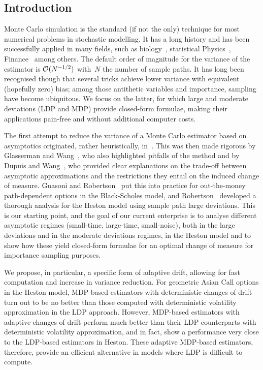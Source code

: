 \subsection{Introduction}
Monte Carlo simulation is the  standard (if not the only) technique for most numerical problems in stochastic modelling.
It has a long history and has been successfully applied in many fields, such as biology~\cite{Manly2018RandomizationBiology}, statistical Physics~\cite{Binder2012MontePhysics}, Finance~\cite{Glasserman1997CounterexamplesProbabilities} among others.
The default order of magnitude for the variance of the estimator is $\mathcal{O}(N^{-1/2})$ with~$N$ the number of sample paths.
It has long been recognised though that several tricks achieve lower variance with equivalent (hopefully zero) bias; among those antithetic variables and importance, sampling have become ubiquitous.
We focus on the latter, for which large and moderate deviations (LDP and MDP) provide closed-form formulae, 
making their applications pain-free and without additional computer costs.

The first attempt to reduce the variance of a Monte Carlo estimator based on asymptotics originated, rather heuristically, in~\cite{Siegmund1976ImportanceTests}. 
This was then made rigorous by Glasserman and Wang~\cite{Glasserman1997CounterexamplesProbabilities}, who also highlighted pitfalls of the method and by Dupuis and Wang~\cite{Dupuis2004ImportanceGames}, who provided clear explanations on the trade-off between asymptotic approximations and the restrictions they entail on the induced change of measure.
Guasoni and Robertson~\cite{Guasoni2007OptimalTime} 
put this into practice for out-the-money path-dependent options in the Black-Scholes model,
and Robertson~\cite{Robertson2010SampleModels} developed a thorough analysis for the Heston model using sample path large deviations.
This is our starting point,
and the goal of our current enterprise is to analyse different asymptotic regimes 
(small-time, large-time, small-noise),
both in the large deviations and in the moderate deviations regimes, in the Heston model 
and to show how these yield closed-form formulae for an optimal change of measure for importance sampling purposes.

We propose, in particular, a specific form of adaptive drift, allowing for fast computation
and increase in variance reduction.
For  geometric Asian Call options in the Heston model, MDP-based estimators with deterministic changes of drift turn out to be no better than those computed with deterministic volatility approximation in the LDP approach. 
However, MDP-based estimators with adaptive changes of drift perform much better than their LDP counterparts with deterministic volatility approximation, 
and in fact, show a performance very close to the LDP-based estimators in Heston. 
These adaptive MDP-based estimators, therefore, provide an efficient alternative in models where 
LDP is difficult to compute.

